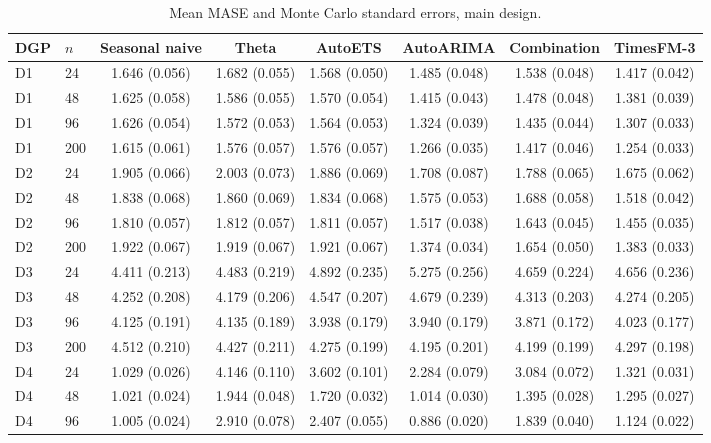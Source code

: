 \begin{table}[!htbp]
\centering
\begin{threeparttable}
\caption{Mean MASE and Monte Carlo standard errors, main design.}
\label{tab:si-mcse}
\scriptsize\setlength{\tabcolsep}{3pt}\renewcommand{\arraystretch}{0.9}
\begin{tabular}{llcccccc}
\toprule
DGP & $n$ & Seasonal naive & Theta & AutoETS & AutoARIMA & Combination & TimesFM-3 \\
\midrule
D1 & 24 & 1.646 (0.056) & 1.682 (0.055) & 1.568 (0.050) & 1.485 (0.048) & 1.538 (0.048) & 1.417 (0.042) \\
D1 & 48 & 1.625 (0.058) & 1.586 (0.055) & 1.570 (0.054) & 1.415 (0.043) & 1.478 (0.048) & 1.381 (0.039) \\
D1 & 96 & 1.626 (0.054) & 1.572 (0.053) & 1.564 (0.053) & 1.324 (0.039) & 1.435 (0.044) & 1.307 (0.033) \\
D1 & 200 & 1.615 (0.061) & 1.576 (0.057) & 1.576 (0.057) & 1.266 (0.035) & 1.417 (0.046) & 1.254 (0.033) \\
D2 & 24 & 1.905 (0.066) & 2.003 (0.073) & 1.886 (0.069) & 1.708 (0.087) & 1.788 (0.065) & 1.675 (0.062) \\
D2 & 48 & 1.838 (0.068) & 1.860 (0.069) & 1.834 (0.068) & 1.575 (0.053) & 1.688 (0.058) & 1.518 (0.042) \\
D2 & 96 & 1.810 (0.057) & 1.812 (0.057) & 1.811 (0.057) & 1.517 (0.038) & 1.643 (0.045) & 1.455 (0.035) \\
D2 & 200 & 1.922 (0.067) & 1.919 (0.067) & 1.921 (0.067) & 1.374 (0.034) & 1.654 (0.050) & 1.383 (0.033) \\
D3 & 24 & 4.411 (0.213) & 4.483 (0.219) & 4.892 (0.235) & 5.275 (0.256) & 4.659 (0.224) & 4.656 (0.236) \\
D3 & 48 & 4.252 (0.208) & 4.179 (0.206) & 4.547 (0.207) & 4.679 (0.239) & 4.313 (0.203) & 4.274 (0.205) \\
D3 & 96 & 4.125 (0.191) & 4.135 (0.189) & 3.938 (0.179) & 3.940 (0.179) & 3.871 (0.172) & 4.023 (0.177) \\
D3 & 200 & 4.512 (0.210) & 4.427 (0.211) & 4.275 (0.199) & 4.195 (0.201) & 4.199 (0.199) & 4.297 (0.198) \\
D4 & 24 & 1.029 (0.026) & 4.146 (0.110) & 3.602 (0.101) & 2.284 (0.079) & 3.084 (0.072) & 1.321 (0.031) \\
D4 & 48 & 1.021 (0.024) & 1.944 (0.048) & 1.720 (0.032) & 1.014 (0.030) & 1.395 (0.028) & 1.295 (0.027) \\
D4 & 96 & 1.005 (0.024) & 2.910 (0.078) & 2.407 (0.055) & 0.886 (0.020) & 1.839 (0.040) & 1.124 (0.022) \\

\end{tabular}
\end{threeparttable}
\end{table}
